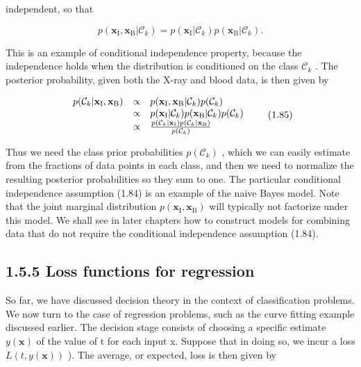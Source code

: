 \documentclass[
  10
]{article}
\begin{document}
independent, so that

\[
p (\mathbf {x} _ {\mathrm{I}}, \mathbf {x} _ {\mathrm{B}} | \mathcal {C} _ {k}) = p (\mathbf {x} _ {\mathrm{I}} | \mathcal {C} _ {k}) p (\mathbf {x} _ {\mathrm{B}} | \mathcal {C} _ {k}).\tag{1.84}
\]

This is an example of conditional independence property, because the
independence holds when the distribution is conditioned on the class
\(\mathcal { C } _ { k }\) . The posterior probability, given both the
X-ray and blood data, is then given by

\[
\begin{array}{r c l} p (\mathcal {C} _ {k} | \mathbf {x} _ {\mathrm{I}}, \mathbf {x} _ {\mathrm{B}}) & \propto & p (\mathbf {x} _ {\mathrm{I}}, \mathbf {x} _ {\mathrm{B}} | \mathcal {C} _ {k}) p (\mathcal {C} _ {k}) \\ & \propto & p (\mathbf {x} _ {\mathrm{I}} | \mathcal {C} _ {k}) p (\mathbf {x} _ {\mathrm{B}} | \mathcal {C} _ {k}) p (\mathcal {C} _ {k}) \\ & \propto & \frac {p (\mathcal {C} _ {k} | \mathbf {x} _ {\mathrm{I}}) p (\mathcal {C} _ {k} | \mathbf {x} _ {\mathrm{B}})}{p (\mathcal {C} _ {k})} \end{array}\tag{1.85}
\]

Thus we need the class prior probabilities
\(p ( \mathcal { C } _ { k } )\) , which we can easily estimate from the
fractions of data points in each class, and then we need to normalize
the resulting posterior probabilities so they sum to one. The particular
conditional independence assumption (1.84) is an example of the naive
Bayes model. Note that the joint marginal distribution
\(p ( \mathbf { x } _ { \mathrm { I } } , \mathbf { x } _ { \mathrm { B } } )\)
will typically not factorize under this model. We shall see in later
chapters how to construct models for combining data that do not require
the conditional independence assumption (1.84).

\subsection{1.5.5 Loss functions for
regression}\label{loss-functions-for-regression}

So far, we have discussed decision theory in the context of
classification problems. We now turn to the case of regression problems,
such as the curve fitting example discussed earlier. The decision stage
consists of choosing a specific estimate \(y ( \mathbf x )\) of the
value of t for each input x. Suppose that in doing so, we incur a loss
\(L ( t , y ( \mathbf x ) )\) ). The average, or expected, loss is then
given by
\end{document}
